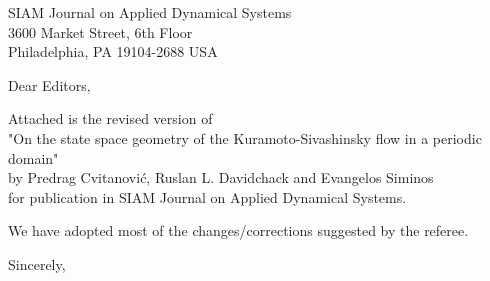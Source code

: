 \documentclass[11pt]{letter}
\date{October 5, 2009}
\begin{document}
\begin{letter}{
SIAM Journal on Applied Dynamical Systems\\
3600 Market Street, 6th Floor\\
Philadelphia, PA 19104-2688 USA
}


\opening{Dear Editors,}

Attached is the revised version of
\\
"On the state space geometry of the
Kuramoto-Sivashinsky flow in a periodic domain"
\\
by Predrag Cvitanovi\'c, Ruslan L. Davidchack and Evangelos Siminos
\\
for publication in SIAM Journal on
Applied Dynamical Systems.

We have adopted most of the changes/corrections suggested by the referee.

\closing{Sincerely,}


\end{letter}
\end{document}
